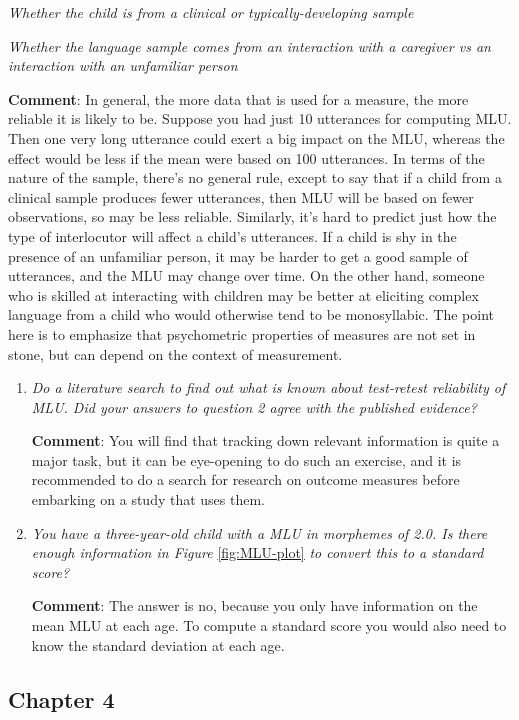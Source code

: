 \documentclass{krantz}
\begin{document}
\emph{Whether the child is from a clinical or typically-developing sample}

\emph{Whether the language sample comes from an interaction with a caregiver vs an interaction with an unfamiliar person}

\textbf{Comment}: In general, the more data that is used for a measure, the more reliable it is likely to be. Suppose you had just 10 utterances for computing MLU. Then one very long utterance could exert a big impact on the MLU, whereas the effect would be less if the mean were based on 100 utterances. In terms of the nature of the sample, there's no general rule, except to say that if a child from a clinical sample produces fewer utterances, then MLU will be based on fewer observations, so may be less reliable. Similarly, it's hard to predict just how the type of interlocutor will affect a child's utterances. If a child is shy in the presence of an unfamiliar person, it may be harder to get a good sample of utterances, and the MLU may change over time. On the other hand, someone who is skilled at interacting with children may be better at eliciting complex language from a child who would otherwise tend to be monosyllabic. The point here is to emphasize that psychometric properties of measures are not set in stone, but can depend on the context of measurement.

\begin{enumerate}
\def\labelenumi{\arabic{enumi}.}
\setcounter{enumi}{2}
\item
  \emph{Do a literature search to find out what is known about test-retest reliability of MLU. Did your answers to question 2 agree with the published evidence?}

  \textbf{Comment}: You will find that tracking down relevant information is quite a major task, but it can be eye-opening to do such an exercise, and it is recommended to do a search for research on outcome measures before embarking on a study that uses them.
\item
  \emph{You have a three-year-old child with a MLU in morphemes of 2.0. Is there enough information in Figure} \ref{fig:MLU-plot} \emph{to convert this to a standard score?}

  \textbf{Comment}: The answer is no, because you only have information on the mean MLU at each age. To compute a standard score you would also need to know the standard deviation at each age.
\end{enumerate}

\hypertarget{chapter-4}{%
\subsection{Chapter 4}\label{chapter-4}}
\end{document}

